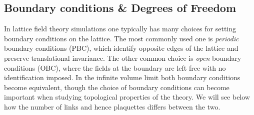 \documentclass[11pt]{article}
\theoremstyle{definition}
\begin{document}
\subsection*{Boundary conditions \& Degrees of Freedom}
In lattice field theory simulations one typically has many choices for setting boundary conditions on the lattice. The most commonly used one is \textit{periodic} boundary conditions (PBC), which identify opposite edges of the lattice and preserve translational invariance. The other common choice is \textit{open} boundary conditions (OBC), where the fields at the boundary are left free with no identification imposed. In the infinite volume limit both boundary conditions become equivalent, though the choice of boundary conditions can become important when studying topological properties of the theory. We will see below how the number of links and hence plaquettes differs between the two.
\end{document}
